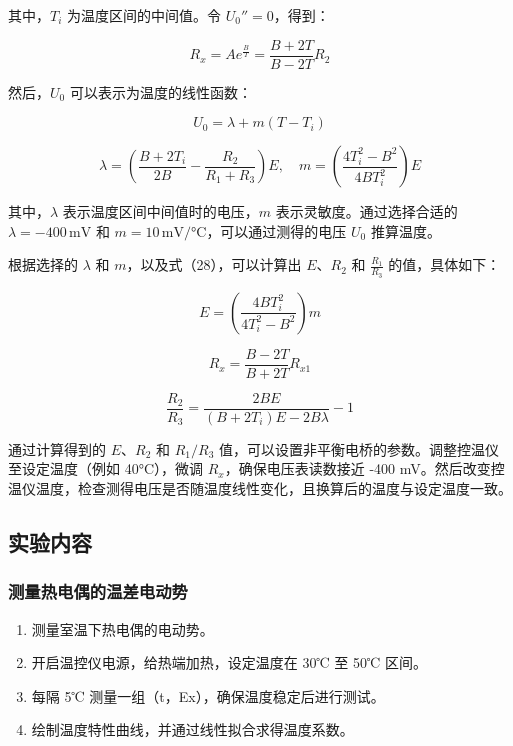 \documentclass[zihao=5, UTF8]{article}
\theoremstyle{MyLineTheoremStyle} %
\theoremstyle{MyBlockTheoremStyle} %
\theoremstyle{MySubsubsectionStyle} %
\begin{document}
其中，$ T_i $ 为温度区间的中间值。令 $ U_0'' = 0 $，得到：

\begin{equation}
R_x = A e^{\frac{B}{T}} = \frac{B + 2T}{B - 2T} R_{2}
\end{equation}

然后，$ U_0 $ 可以表示为温度的线性函数：

\begin{equation}
U_0 = \lambda + m (T - T_i)
\end{equation}

\begin{equation}
\lambda = \left( \frac{B + 2T_i}{2B} - \frac{R_2}{R_1 + R_3} \right) E, \quad m = \left( \frac{4T_i^2 - B^2}{4BT_i^2} \right) E
\end{equation}

其中，$ \lambda $ 表示温度区间中间值时的电压，$ m $ 表示灵敏度。通过选择合适的 $ \lambda = -400 \, \text{mV} $ 和 $ m = 10 \, \text{mV/°C} $，可以通过测得的电压 $ U_0 $ 推算温度。

根据选择的 $ \lambda $ 和 $ m $，以及式（28），可以计算出 $ E $、$ R_2 $ 和 $ \frac{R_1}{R_3} $ 的值，具体如下：

\begin{equation}
E = \left( \frac{4BT_i^2}{4T_i^2 - B^2} \right) m
\end{equation}

\begin{equation}
R_x = \frac{B - 2T}{B + 2T} R_{x1}
\end{equation}

\begin{equation}
\frac{R_2}{R_3} = \frac{2BE}{(B + 2T_i)E - 2B\lambda} - 1
\end{equation}

通过计算得到的 $ E $、$ R_2 $ 和 $ R_1/R_3 $ 值，可以设置非平衡电桥的参数。调整控温仪至设定温度（例如 40°C），微调 $ R_x $，确保电压表读数接近 -400 mV。然后改变控温仪温度，检查测得电压是否随温度线性变化，且换算后的温度与设定温度一致。


\subsection{实验内容}

\subsubsection{测量热电偶的温差电动势}
\begin{enumerate}
    \item 测量室温下热电偶的电动势。
    \item 开启温控仪电源，给热端加热，设定温度在 30℃  至 50℃ 区间。
    \item 每隔 5℃ 测量一组（t，Ex），确保温度稳定后进行测试。
    \item 绘制温度特性曲线，并通过线性拟合求得温度系数。
\end{enumerate}
\end{document}
